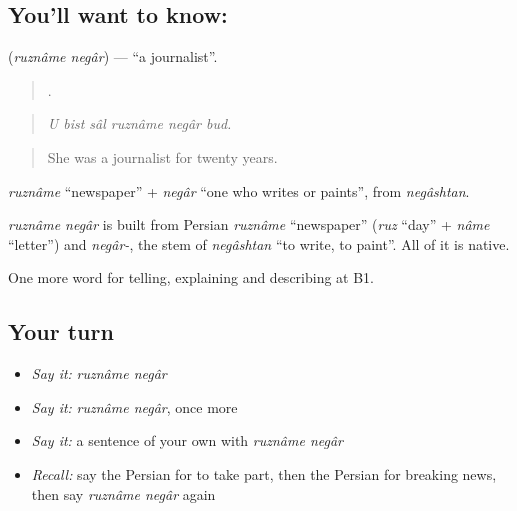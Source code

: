 \subsection*{You'll want to know:  }
\textbf{ } (\emph{ruznâme negâr}) — \textquotedblleft{}a journalist\textquotedblright{}.

\begin{quote}
     .
\end{quote}

\begin{quote}
\emph{U bist sâl ruznâme negâr bud.}
\end{quote}

\begin{quote}
She was a journalist for twenty years.
\end{quote}

\emph{ruznâme} \textquotedblleft{}newspaper\textquotedblright{} + \emph{negâr} \textquotedblleft{}one who writes or paints\textquotedblright{}, from \emph{negâshtan}.

\begin{cousinweb}
\emph{ruznâme negâr} is built from Persian \emph{ruznâme} \textquotedblleft{}newspaper\textquotedblright{} (\emph{ruz} \textquotedblleft{}day\textquotedblright{} + \emph{nâme} \textquotedblleft{}letter\textquotedblright{}) and \emph{negâr-}, the stem of \emph{negâshtan} \textquotedblleft{}to write, to paint\textquotedblright{}. All of it is native.
\end{cousinweb}

\begin{grammarlens}[title={What you've built}]
One more word for telling, explaining and describing at B1.
\end{grammarlens}

\subsection*{Your turn}
\begin{itemize}
\raggedright
  \item \emph{Say it:} \emph{ruznâme negâr}
  \item \emph{Say it:} \emph{ruznâme negâr}, once more
  \item \emph{Say it:} a sentence of your own with \emph{ruznâme negâr}
  \item \emph{Recall:} say the Persian for to take part, then the Persian for breaking news, then say \emph{ruznâme negâr} again
\end{itemize}

